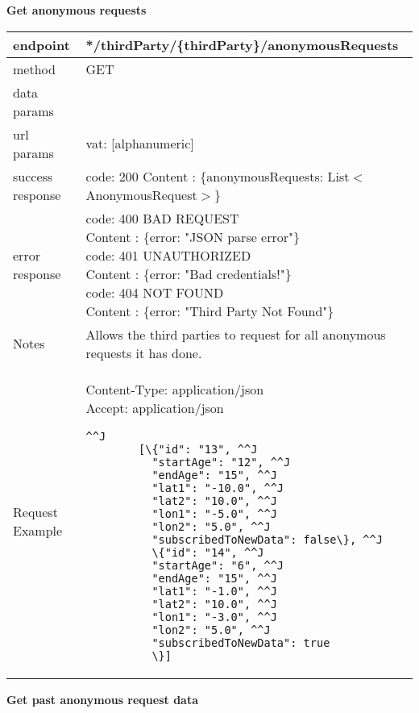 	\textbf{Get anonymous requests} \\

	\begin{tabularx}{\linewidth}{| l| l }
		\hline
		endpoint & */thirdParty/\{thirdParty\}/anonymousRequests \\
		\hline
		method & GET \\
		\hline
		data params & \\
		\hline
		url params &
		\parbox{0.7\textwidth}{
			\bigskip
			vat: [alphanumeric]
			\bigskip
		} \\
		\hline
		success response &
		\parbox{0.7\textwidth}{
			\bigskip
			code: 200\\
			Content : \{anonymousRequests: List$<$AnonymousRequest$>$\}
			\bigskip
		} \\
		\hline
		error response &
		\parbox{0.7\textwidth}{
			\bigskip
			code: 400 BAD REQUEST \\
			Content : \{error: "JSON parse error"\}\\
			code: 401 UNAUTHORIZED \\
			Content : \{error: "Bad credentials!"\}\\
			code: 404 NOT FOUND \\
			Content : \{error: "Third Party Not Found"\}
			\bigskip
		} \\
		\hline
		Notes & 
		\parbox{0.7\textwidth}{
			\bigskip Allows the third parties to request for all anonymous requests it has done.
		\bigskip}  \\
		\hline
		Request Example & 
		\parbox{0.8\textwidth}{
		\bigskip
		Content-Type: application/json \\
		Accept: application/json \\
		\bigskip
		\begin{lstlisting}^^J
		[\{"id": "13", ^^J
		  "startAge": "12", ^^J
		  "endAge": "15", ^^J
		  "lat1": "-10.0", ^^J
		  "lat2": "10.0", ^^J
		  "lon1": "-5.0", ^^J
		  "lon2": "5.0", ^^J
		  "subscribedToNewData": false\}, ^^J
		  \{"id": "14", ^^J
		  "startAge": "6", ^^J
		  "endAge": "15", ^^J
		  "lat1": "-1.0", ^^J
		  "lat2": "10.0", ^^J
		  "lon1": "-3.0", ^^J
		  "lon2": "5.0", ^^J
		  "subscribedToNewData": true
		  \}]
		\end{lstlisting}
	} \\
		\hline
	\end{tabularx}
	
	\textbf{Get past anonymous request data} \\

